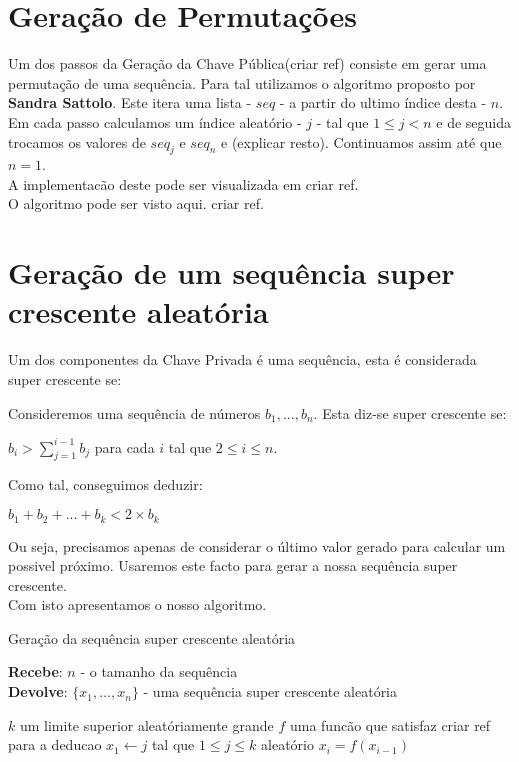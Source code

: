 \documentclass[11pt]{report}
\begin{document}
\section{Geração de Permutações}

Um dos passos da Geração da Chave Pública(criar ref) consiste em gerar uma permutação de uma sequência. Para tal utilizamos o algoritmo proposto por \textbf{Sandra Sattolo}. Este itera uma lista - $seq$ - a partir do ultimo índice desta - $n$. Em cada passo calculamos um índice aleatório - $j$ - tal que $1 \le j < n$ e de seguida trocamos os valores de $seq_j$ e $seq_n$ e (explicar resto). Continuamos assim até que $n = 1$.\\
A implementacão deste pode ser visualizada em criar ref.\\
O algoritmo pode ser visto aqui. criar ref.

\section{Geração de um sequência super crescente aleatória}

Um dos componentes da Chave Privada é uma sequência, esta é considerada super crescente se:\\
\begin{samepage}
	\begin{definition}
	Consideremos uma sequência de números ${b_1, ..., b_n}$. Esta diz-se super crescente se:
	\begin{center}
		$b_i > \sum_{j = 1}^{i - 1} b_j$ para cada $i$ tal que $2 \le i \le n$. 
	\end{center}
	\end{definition}
\end{samepage}
Como tal, conseguimos deduzir:

\begin{center}
	$b_1 + b_2 + ... + b_k < 2 \times b_k$
\end{center}
Ou seja, precisamos apenas de considerar o último valor gerado para calcular um possivel próximo.
Usaremos este facto para gerar a nossa sequência super crescente.\\
Com isto apresentamos o nosso algoritmo.
\begin{algorithm}
	\caption{Geração da sequência super crescente aleatória}
	\textbf{Recebe}: $n$ - o tamanho da sequência\\
	\textbf{Devolve}: $\{x_1, ..., x_n\}$ - uma sequência super crescente aleatória
	\begin{algorithmic}[1]
		\State $k$ um limite superior aleatóriamente grande
		\State $f$ uma funcão que satisfaz criar ref para a deducao 
		\State $x_1 \gets j$ tal que $1 \le j \le k$ aleatório
			\State $x_i = f(x_{i-1})$
		\EndFor
\end{algorithmic}
\end{algorithm}
\end{document}

